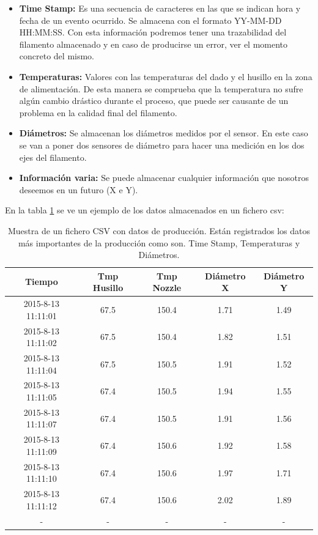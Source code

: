 \begin{itemize}
    \item{\textbf{Time Stamp: }Es una secuencia de caracteres en las que se indican hora y fecha de un evento ocurrido. Se almacena con el formato YY-MM-DD HH:MM:SS. Con esta información podremos tener una trazabilidad del filamento almacenado y en caso de producirse un error, ver el momento concreto del mismo.}
    \item{\textbf{Temperaturas: }Valores con las temperaturas del dado y el husillo en la zona de alimentación. De esta manera se comprueba que la temperatura no sufre algún cambio drástico durante el proceso, que puede ser causante de un problema en la calidad final del filamento.}
    \item{\textbf{Diámetros: }Se almacenan los diámetros medidos por el sensor. En este caso se van a poner dos sensores de diámetro para hacer una medición en los dos ejes del filamento.}
    \item{\textbf{Información varia: }Se puede almacenar cualquier información que nosotros deseemos en un futuro (X e Y).}
\end{itemize}

En la tabla \ref{tab:plc_csv} se ve un ejemplo de los datos almacenados en un fichero csv:

\begin{table}[H]
    \centering
    \begin{tabular}{ccccc}
        {\bf Tiempo}         & {\bf Tmp Husillo} & {\bf Tmp Nozzle} & {\bf Diámetro X} & {\bf Diámetro Y} \\ \hline
        2015-8-13 11:11:01  & 67.5              & 150.4            & 1.71         & 1.49         \\
        2015-8-13 11:11:02  & 67.5              & 150.4            & 1.82         & 1.51         \\
        2015-8-13 11:11:04  & 67.5              & 150.5            & 1.91         & 1.52         \\
        2015-8-13 11:11:05  & 67.4              & 150.5            & 1.94         & 1.55         \\
        2015-8-13 11:11:07  & 67.4              & 150.5            & 1.91         & 1.56         \\
        2015-8-13 11:11:09  & 67.4              & 150.6            & 1.92         & 1.58         \\
        2015-8-13 11:11:10 & 67.4              & 150.6             & 1.97          & 1.71         \\
        2015-8-13 11:11:12 & 67.4              & 150.6             & 2.02          & 1.89        \\
                -          &    -              & -                & -                & -
    \end{tabular}
    \caption[Muestra de un fichero CSV con datos de producción.]{Muestra de un fichero CSV con datos de producción. Están registrados los datos más importantes de la producción como son. Time Stamp, Temperaturas y Diámetros.}
    \label{tab:plc_csv}
\end{table}

